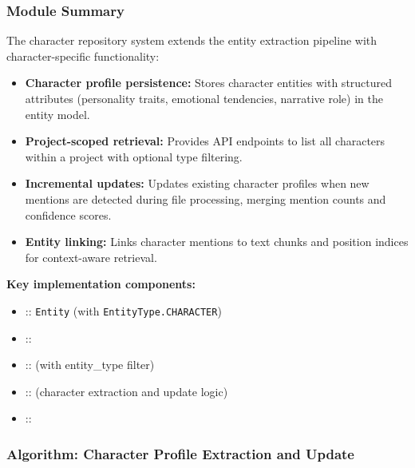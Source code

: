 \subsubsection{Module Summary}

The character repository system extends the entity extraction pipeline with character-specific functionality:

\begin{itemize}
    \item \textbf{Character profile persistence:} Stores character entities with structured attributes (personality traits, emotional tendencies, narrative role) in the entity model.
    \item \textbf{Project-scoped retrieval:} Provides API endpoints to list all characters within a project with optional type filtering.
    \item \textbf{Incremental updates:} Updates existing character profiles when new mentions are detected during file processing, merging mention counts and confidence scores.
    \item \textbf{Entity linking:} Links character mentions to text chunks and position indices for context-aware retrieval.
\end{itemize}

\textbf{Key implementation components:}
{\small
\begin{itemize}
    \item \texttt{} :: \texttt{Entity} (with \texttt{EntityType.CHARACTER})
    \item \texttt{} :: \texttt{}
    \item \texttt{} :: \texttt{} (with entity\_type filter)
    \item \texttt{} :: \texttt{} (character extraction and update logic)
    \item \texttt{} :: \texttt{}
\end{itemize}
}

\subsubsection{Algorithm: Character Profile Extraction and Update}

